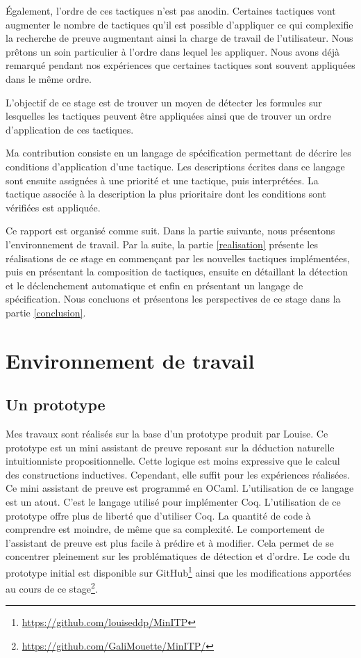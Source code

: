 \documentclass[french,titlepage]{article}
\begin{document}
Également, l'ordre de ces tactiques n'est pas anodin. Certaines tactiques vont augmenter le nombre de tactiques qu'il est possible d'appliquer ce qui complexifie la recherche de preuve augmentant ainsi la charge de travail de l'utilisateur. Nous prêtons un soin particulier à l'ordre dans lequel les appliquer. Nous avons déjà remarqué pendant nos expériences que certaines tactiques sont souvent appliquées dans le même ordre.

L'objectif de ce stage est de trouver un moyen de détecter les formules sur lesquelles les tactiques peuvent être appliquées ainsi que de trouver un ordre d'application de ces tactiques.

Ma contribution consiste en un langage de spécification permettant de décrire les conditions d'application d'une tactique. Les descriptions écrites dans ce langage sont ensuite assignées à une priorité et une tactique, puis interprétées. La tactique associée à la description la plus prioritaire dont les conditions sont vérifiées est appliquée.

Ce rapport est organisé comme suit. Dans la partie suivante, nous présentons l'environnement de travail. Par la suite, la partie \ref{realisation} présente les réalisations de ce stage en commençant par les nouvelles tactiques implémentées, puis en présentant la composition de tactiques, ensuite en détaillant la détection et le déclenchement automatique et enfin en présentant un langage de spécification. Nous concluons et présentons les perspectives de ce stage dans la partie \ref{conclusion}.



\section{Environnement de travail} \label{env_travail}
\subsection{Un prototype} \label{env_travail:proto}
Mes travaux sont réalisés sur la base d'un prototype produit par Louise. Ce prototype est un mini assistant de preuve reposant sur la déduction naturelle intuitionniste propositionnelle. Cette logique est moins expressive que le calcul des constructions inductives. Cependant, elle suffit pour les expériences réalisées. Ce mini assistant de preuve est programmé en OCaml. L'utilisation de ce langage est un atout. C'est le langage utilisé pour implémenter Coq. L'utilisation de ce prototype offre plus de liberté que d'utiliser Coq. La quantité de code à comprendre est moindre, de même que sa complexité. Le comportement de l'assistant de preuve est plus facile à prédire et à modifier. Cela permet de se concentrer pleinement sur les problématiques de détection et d'ordre. Le code du prototype initial est disponible sur GitHub\footnote{\url{https://github.com/louiseddp/MinITP}} ainsi que les modifications apportées au cours de ce stage\footnote{\url{https://github.com/GaliMouette/MinITP/}}.
\end{document}
